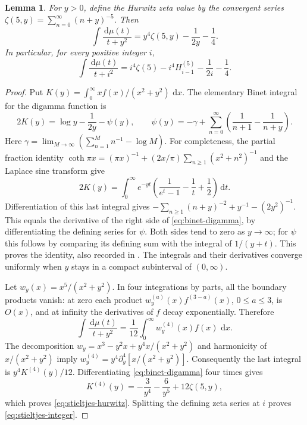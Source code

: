\documentclass[11pt,letterpaper]{article}
\newtheorem{lemma}[lemma]{Lemma}
\theoremstyle{definition}
\newcommand{\dd}{\,\mathrm d}
\begin{document}
\begin{lemma}\label{lem:stieltjes}
For $y>0$, define the Hurwitz zeta value by the convergent series
$\zeta(5,y)=\sum_{n=0}^{\infty}(n+y)^{-5}$. Then
\begin{equation}\label{eq:stieltjes-hurwitz}
 \int\frac{\dd\mu(t)}{t+y^2}
 =y^4\zeta(5,y)-\frac1{2y}-\frac14.
\end{equation}
In particular, for every positive integer $i$,
\begin{equation}\label{eq:stieltjes-integer}
 \int\frac{\dd\mu(t)}{t+i^2}
 =i^4\zeta(5)-i^4H_{i-1}^{(5)}-\frac1{2i}-\frac14.
\end{equation}
\end{lemma}
\begin{proof}
Put $K(y)=\int_0^\infty xf(x)/(x^2+y^2)\,\dd x$. The elementary Binet
integral for the digamma function is
\begin{equation}\label{eq:binet-digamma}
 2K(y)=\log y-\frac1{2y}-\psi(y),
 \qquad
 \psi(y)=-\gamma+\sum_{n=0}^{\infty}
 \left(\frac1{n+1}-\frac1{n+y}\right).
\end{equation}
Here $\gamma=\lim_{M\to\infty}(\sum_{n=1}^M n^{-1}-\log M)$.
For completeness, the partial fraction identity
$\coth\pi x=(\pi x)^{-1}+(2x/\pi)\sum_{n\ge1}(x^2+n^2)^{-1}$
and the Laplace sine transform give
\[
 2K(y)=\int_0^\infty e^{-yt}
 \left(\frac1{e^t-1}-\frac1t+\frac12\right)\dd t.
\]
Differentiation of this last integral gives
$-\sum_{n\ge1}(n+y)^{-2}+y^{-1}-(2y^2)^{-1}$.
This equals the derivative of the right side of
\eqref{eq:binet-digamma}, by differentiating the defining series for
$\psi$. Both sides tend to zero as $y\to\infty$; for $\psi$ this follows
by comparing its defining sum with the integral of $1/(y+t)$.
This proves the identity, also recorded in \cite[\S5.9.15]{dlmf}.
The integrals and their derivatives converge uniformly when $y$ stays in
a compact subinterval of $(0,\infty)$.

Let $w_y(x)=x^5/(x^2+y^2)$. In four integrations by parts, all the boundary
products vanish: at zero each product
$w_y^{(a)}(x)f^{(3-a)}(x)$, $0\le a\le3$, is $O(x)$, and at infinity
the derivatives of $f$ decay exponentially. Therefore
\[
 \int\frac{\dd\mu(t)}{t+y^2}
 =\frac1{12}\int_0^\infty w_y^{(4)}(x)f(x)\,\dd x.
\]
The decomposition
$w_y=x^3-y^2x+y^4x/(x^2+y^2)$ and harmonicity of
$x/(x^2+y^2)$ imply
$w_y^{(4)}=y^4\partial_y^4[x/(x^2+y^2)]$.
Consequently the last integral is $y^4K^{(4)}(y)/12$.
Differentiating \eqref{eq:binet-digamma} four times gives
\[
 K^{(4)}(y)=-\frac3{y^4}-\frac6{y^5}+12\zeta(5,y),
\]
which proves \eqref{eq:stieltjes-hurwitz}. Splitting the defining zeta
series at $i$ proves \eqref{eq:stieltjes-integer}.
\end{proof}
\end{document}

